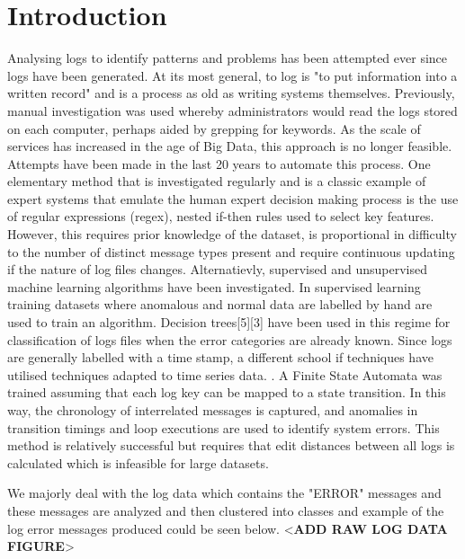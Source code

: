 
\section{Introduction}\label{sec:introduction}
Analysing logs to identify patterns and problems has been attempted ever
since logs have been generated. At its most general, to log is "to put information into a written record" and is a process as old as writing systems themselves. Previously, manual investigation was used whereby administrators would read the logs stored on each computer, perhaps aided by grepping for keywords. As the scale of services has increased in the age of Big Data, this approach is no longer feasible. Attempts have been made in the last 20 years to automate this process. One elementary method that is investigated regularly and is a classic example of expert systems that emulate the human expert decision making process is the use of regular expressions (regex), nested if-then rules used to select key features. However,
this requires prior knowledge of the dataset, is proportional in difficulty to
the number of distinct message types present  and require continuous updating if the nature of log files
changes.  Alternatievly, supervised and unsupervised machine learning algorithms have been investigated. In supervised
learning training datasets where anomalous and normal data are labelled by
hand are used to train an algorithm. Decision trees[5][3] have been used
in this regime for classification of logs files when the error categories are
already known. Since logs are generally labelled with a time stamp, a different school if techniques have utilised techniques adapted to time series data. . A Finite State Automata
was trained assuming that each log key can be mapped to a state transition.
In this way, the chronology of interrelated messages is captured, and anomalies in transition timings and loop executions are used to identify system errors. This method is relatively successful but requires that edit distances between all logs is calculated which is infeasible for large datasets.

We majorly deal with the log data which contains the "ERROR" messages and these messages are analyzed and then clustered into classes and example of the log error messages produced could be seen below. 
<\textbf{ADD RAW LOG DATA FIGURE}>
